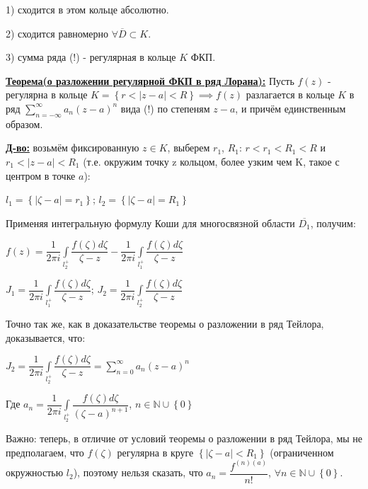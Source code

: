 \documentclass[a4paper, 12pt]{article}
\begin{document}
  1) сходится в этом кольце абсолютно.

  2) сходится равномерно $\forall \overline{D} \subset K$.

  3) сумма ряда (!) - регулярная в кольце $K$ ФКП.

  \quad \textbf{\underline{Теорема(о разложении регулярной ФКП в ряд Лорана):}} Пусть $f(z)$ - регулярна в кольце $K = \left\{ r < |z - a| <R \right\} \implies f(z)$ разлагается в кольце $K$ в ряд $\displaystyle\sum\limits_{n=-\infty}^{\infty} a_n (z-a)^n$ вида (!) по степеням $z -a$, и причём единственным образом.

  \quad \textbf{\underline{Д-во:}} возьмём фиксированную $z \in K$, выберем $r_1$, $R_1$: $r < r_1 < R_1 < R$ и $r_1 < |z-a| < R_1 $ (т.е. окружим точку z кольцом, более узким чем K, такое с центром в точке $a$):

  \begin{center}
    $l_1 = \left\{ |\zeta - a| = r_1 \right\}$; $l_2 = \left\{ |\zeta - a| = R_1 \right\}$
  \end{center}

  \quad Применяя интегральную формулу Коши для многосвязной области $\overline{D_1}$, получим:

  \begin{center}
    $f(z) = \dfrac{1}{2 \pi i} \displaystyle\int\limits_{l_2^+} \dfrac{f(\zeta) d\zeta}{\zeta - z} - \dfrac{1}{2 \pi i} \displaystyle\int\limits_{l_1^+} \dfrac{f(\zeta) d\zeta}{\zeta - z}$

    $J_1 = \dfrac{1}{2 \pi i} \displaystyle\int\limits_{l_1^+} \dfrac{f(\zeta) d\zeta}{\zeta - z}$; $J_2 = \dfrac{1}{2 \pi i}\displaystyle\int\limits_{l_2^+} \dfrac{f(\zeta) d\zeta}{\zeta -z}$
  \end{center}

  \quad Точно так же, как в доказательстве теоремы о разложении в ряд Тейлора, доказывается, что:

  \begin{center}
    $J_2 = \dfrac{1}{2 \pi i} \displaystyle\int\limits_{l_2^+} \dfrac{f(\zeta) d\zeta}{\zeta - z} = \displaystyle\sum\limits_{n=0}^{\infty} a_n (z-a)^n$

    Где $a_n = \dfrac{1}{2 \pi i}\displaystyle\int\limits_{l_2^+} \dfrac{f(\zeta) d\zeta}{(\zeta - a)^{n+1}}$, $n \in \mathbb{N} \cup \left\{ 0 \right\}$
    
  \end{center}

  \quad Важно: теперь, в отличие от условий теоремы о разложении в ряд Тейлора, мы не предполагаем, что $f(\zeta)$ регулярна в круге $\left\{ |\zeta - a| < R_1 \right\}$ (ограниченном окружностью $l_2$), поэтому нельзя сказать, что $a_n = \dfrac{f^{(n) (a)}}{n!}$, \newline $\forall n \in \mathbb{N} \cup \left\{ 0 \right\}$.
\end{document}
